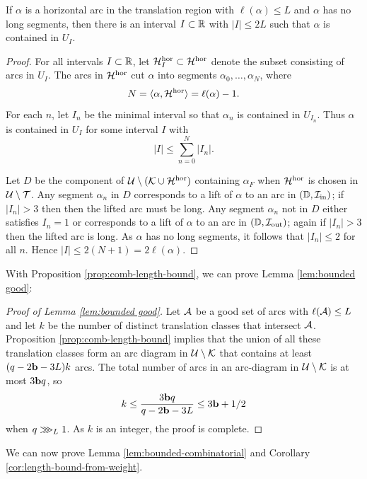 \documentclass[12pt]{amsart}
\begin{document}
\begin{prop}\label{prop:comb-length-bound}
	If $\alpha$ is a horizontal arc in the translation region with $\ell(\alpha)\leq L$ and $\alpha$ has no long segments, then there is an interval $I\subset \R$ with $|I|\leq 2L$ such that $\alpha$ is contained in $U_I$.
\end{prop}

\begin{proof}
	For all intervals $I\subset \R$, let $\HH_I^\hor\subset \HH^\hor$ denote the subset consisting of arcs in $U_I$. 
	The arcs in $\HH^\hor$ cut $\alpha$ into segments $\alpha_0, \dots, \alpha_N$, where $$N = \langle \alpha, \HH^\hor\rangle= \ell(\alpha)-1.$$ 
	For each $n$, let $I_n$ be the minimal interval so that $\alpha_n$ is contained in $U_{I_n}$. 
	Thus $\alpha$ is contained in $U_I$ for some interval $I$ with 
	\begin{equation}
		|I| \leq \sum_{n=0}^N|I_n|.
	\end{equation}
	
	
	Let $D$ be the component of $\UU\sm (\KK\cup \HH^\hor)$ containing $\alpha_F$ when $\HH^\hor$ is chosen in $\UU\sm \TT$. Any segment $\alpha_n$ in $D$ corresponds to a lift of $\alpha$ to an arc in $(\D, \II_\inbr)$; if $|I_n|> 3$ then then the lifted arc must be long. Any segment $\alpha_n$ not in $D$ either satisfies $I_n = 1$ or corresponds to a lift of $\alpha$ to an arc in $(\D, \II_\outbr)$; again if $|I_n|> 3$ then the lifted arc is long. 
	As $\alpha$ has no long segments, it follows that $|I_n|\leq 2$ for all $n$. Hence $|I|\leq 2 (N+1)=2 \ell(\alpha)$.
\end{proof}

With Proposition \ref{prop:comb-length-bound}, we can prove Lemma \ref{lem:bounded good}:
\begin{proof}[Proof of Lemma \ref{lem:bounded good}]
	Let $\AA$ be a good set of arcs with $\ell(\AA)\leq L$ and let $k$ be the number of distinct translation classes that intersect $\AA$.
	Proposition \ref{prop:comb-length-bound} implies that the union of all these translation classes form an arc diagram in $\UU\sm \KK$  that contains at least $(q-2\bound-3L)k$ arcs. The total number of arcs in an arc-diagram in $\UU\sm \KK$ is at most $3\bound q$, so
	$$k \leq \frac{3\bound q}{q-2\bound -3L}\leq 3\bound+1/2$$
	when $q\largegiven{L}$. As $k$ is an integer, the proof is complete.
\end{proof}


We can now prove Lemma \ref{lem:bounded-combinatorial} and Corollary \ref{cor:length-bound-from-weight}. 
\end{document}
